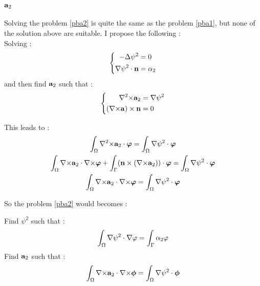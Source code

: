 \subsection{${\mathbf{a}}_2$}
Solving the problem \ref{pba2} is quite the same as the problem \ref{pba1}, but none of the solution above are suitable. I propose the following :\\
Solving :
\begin{equation*}
  \left\{
  \begin{aligned}
    -{\Delta}\psi^2 &=0\\
    {\nabla}\psi^2\cdot{\mathbf{n}} &= \alpha_2
  \end{aligned}
  \right.
\end{equation*}
and then find ${\mathbf{a}}_2$ such that :
\begin{equation*}
  \left\{
  \begin{aligned}
    {\nabla^2\times}{\mathbf{a}}_2 &= {\nabla}\psi^2\\
    ({\nabla\times}{\mathbf{a}})\times{\mathbf{n}} &= 0
  \end{aligned}
  \right.
\end{equation*}

This leads to :
\begin{gather*}
  \int_\Omega {\nabla^2\times}{\mathbf{a}}_2\cdot\bm{\varphi} = \int_\Omega{\nabla}\psi^2\cdot\bm{\varphi}\\
  \int_\Omega {\nabla\times}{\mathbf{a}}_2\cdot{\nabla\times}\bm{\varphi} + \int_\Gamma ({\mathbf{n}}\times({\nabla\times}{\mathbf{a}}_2))\cdot\bm{\varphi} = \int_\Omega {\nabla}\psi^2\cdot\bm{\varphi}\\
  \int_\Omega {\nabla\times}{\mathbf{a}}_2\cdot{\nabla\times}\bm{\varphi} = \int_\Omega {\nabla}\psi^2\cdot\bm{\varphi}
\end{gather*}

So the problem \ref{pba2} would becomes :
\begin{pb}\label{fva2}
  Find $\psi^2$ such that :
  \[ \int_\Omega {\nabla}\psi^2\cdot{\nabla}\varphi = \int_\Gamma \alpha_2\varphi \]
  Find ${\mathbf{a}}_2$ such that :
  \[ \int_\Omega {\nabla\times}{\mathbf{a}}_2\cdot{\nabla\times}\bm{\phi} = \int_\Omega {\nabla}\psi^2\cdot\bm{\phi} \]
\end{pb}
  
